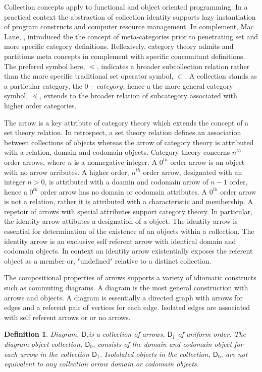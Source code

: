 \documentclass[aps,twocolumn,secnumarabic,nobalancelastpage,amsmath,amssymb,
amsthm,nofootinbib,parskip=full]{revtex4}
\numberwithin{equation}{section}
\newtheorem{definition}{Definition}[section]
\newcommand{\diag}[1]{\mathbf{\mathsf{#1}}}
\newcommand{\diagobj}[1]{\diag{#1}_0}
\newcommand{\diagarr}[1]{\diag{#1}_1}
\begin{document}
Collection concepts apply to functional and object oriented programming.
In a practical context the abstraction
of collection identity supports lazy instantiation
of program constructs and computer resource management.
In complement, Mac Lane, \cite{maclane1998}, introduced the
the concept of meta-categories prior to penetrating set
and more specific category definitions. Reflexively, category
theory admits and partitions meta concepts in complement
with specific concomitant definitions.
The prefered symbol here, $\lessdot$, indicates a broader subcollection relation
rather than the more specific traditional set operator symbol, $\subset$.
A collection stands as a particular category, the $0-category$,
hence a the more general category symbol, $\lessdot$,
extends to the broader relation of subcategory
associated with higher order categories.

The arrow is a key attribute of category theory which
extends the concept of a set theory relation.
In retrospect, a set theory relation defines an association between
collections of objects whereas the arrow of category theory is attributed
with a relation, domain and codomain objects.
Category theory concerns $n^{th}$ order arrows,
where $n$ is a nonnegative integer.
A $0^{th}$ order arrow is an object with no arrow arributes.
A higher order, $n^{th}$ order arrow, designated with an integer $n>0$,
is attributed with a doamin and codomain arrow of $n-1$ order,
hence a $0^{th}$ order arrow has no domain or codomain attributes.
A $0^{th}$ order arrow is not a relation, rather it is attributed with
a characteristic and membership.
A repetoir of arrows with special attributes support category theory.
In particular, the identity arrow attibutes a designation of a object.
The identity arrow is essential for determination of the existence of an
objects within a collection. The identity arrow is an exclusive self referent
arrow with identical domain and codomain objects.
In context an identity arrow existentially exposes the referent
object as a member or, "undefined" relative to a distinct collection.

The compositional properties of arrows supports a variety of
idiomatic constructs such as commuting diagrams. A diagram is the
most general construction with arrows and objects.
A diagram is essentially a directed graph with arrows for edges
and a referent pair of vertices for each edge. Isolated edges
are associated with self referent arrows or or no arrows.

\begin{definition}{Diagram, $\diag{D}$},\label{def:diagram}
  is a collection of arrows, $\diagarr{D}$ of uniform order.
  The diagram object collection,
  $\diagobj{D}$, consists of the domain and codomain object for each arrow
  in the collection $\diagarr{D}$.
  Isololated objects in the collection, $\diagobj{D}$, are not equivalent to
  any collection arrow domain or codomain objects.
\end{definition}
\end{document}

